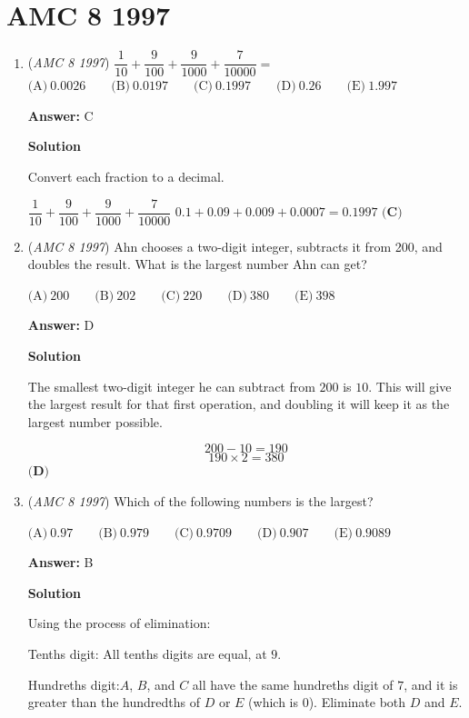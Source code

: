\section{AMC 8 1997}
        \begin{enumerate}
        	\item (\textit{AMC 8 1997}) $\dfrac{1}{10} + \dfrac{9}{100} + \dfrac{9}{1000} + \dfrac{7}{10000} =$
$\text{(A)}\ 0.0026 \qquad \text{(B)}\ 0.0197 \qquad \text{(C)}\ 0.1997 \qquad \text{(D)}\ 0.26 \qquad \text{(E)}\ 1.997$

 \textbf{Answer: }C



\textbf{Solution}

Convert each fraction to a decimal.

 $\dfrac{1}{10} + \dfrac{9}{100} + \dfrac{9}{1000} + \dfrac{7}{10000}$
$0.1+0.09+0.009+0.0007=0.1997$
$\boxed{\textbf{(C)}}$



	\item (\textit{AMC 8 1997}) Ahn chooses a two-digit integer, subtracts it from 200, and doubles the result.  What is the largest number Ahn can get?


 $\text{(A)}\ 200 \qquad \text{(B)}\ 202 \qquad \text{(C)}\ 220 \qquad \text{(D)}\ 380 \qquad \text{(E)}\ 398$

 \textbf{Answer: }D



\textbf{Solution}

The smallest two-digit integer he can subtract from $200$ is $10$.  This will give the largest result for that first operation, and doubling it will keep it as the largest number possible.

 
 \[200-10=190\]
 \[190\times2=380\]
$\boxed{\textbf{(D)}}$



	\item (\textit{AMC 8 1997}) Which of the following numbers is the largest?


 $\text{(A)}\ 0.97 \qquad \text{(B)}\ 0.979 \qquad \text{(C)}\ 0.9709 \qquad \text{(D)}\ 0.907 \qquad \text{(E)}\ 0.9089$

 \textbf{Answer: }B



\textbf{Solution}

Using the process of elimination:

 Tenths digit: All tenths digits are equal, at $9$.

 Hundreths digit:$A$, $B$, and $C$ all have the same hundreths digit of $7$, and it is greater than the hundredths of $D$ or $E$ (which is $0$).  Eliminate both $D$ and $E$.


\end{enumerate}
